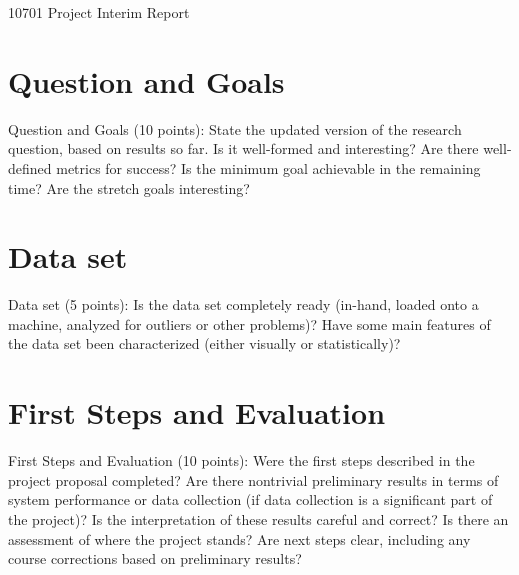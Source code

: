 \documentclass{article}
\begin{document}
\begin{center}
\Large 10701 Project Interim Report
\end{center}

\section{Question and Goals}
Question and Goals (10 points): State the updated version of the research question, based on results so far. Is it well-formed and interesting? Are there well-defined metrics for success? Is the minimum goal achievable in the remaining time? Are the stretch goals interesting?

\section{Data set}
Data set (5 points): Is the data set completely ready (in-hand, loaded onto a machine, analyzed for outliers or other problems)? Have some main features of the data set been characterized (either visually or statistically)?

\section{First Steps and Evaluation}
First Steps and Evaluation (10 points): Were the first steps described in the project proposal completed? Are there nontrivial preliminary results in terms of system performance or data collection (if data collection is a significant part of the project)? Is the interpretation of these results careful and correct? Is there an assessment of where the project stands? Are next steps clear, including any course corrections based on preliminary results?
\end{document}
